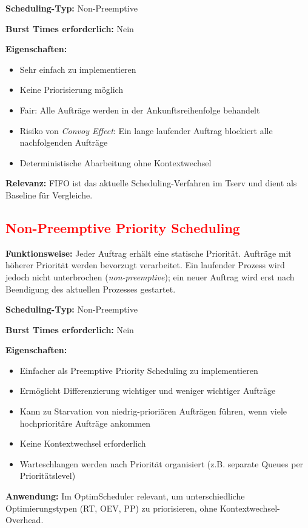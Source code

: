 \textbf{Scheduling-Typ:} Non-Preemptive

\textbf{Burst Times erforderlich:} Nein

\textbf{Eigenschaften:}
\begin{itemize}
    \item Sehr einfach zu implementieren
    \item Keine Priorisierung möglich
    \item Fair: Alle Aufträge werden in der Ankunftsreihenfolge behandelt
    \item Risiko von \textit{Convoy Effect}: Ein lange laufender Auftrag blockiert alle nachfolgenden Aufträge
    \item Deterministische Abarbeitung ohne Kontextwechsel
\end{itemize}

\textbf{Relevanz:} FIFO ist das aktuelle Scheduling-Verfahren im Tserv und dient als Baseline für Vergleiche.

\subsection{\textcolor{red}{Non-Preemptive Priority Scheduling}}

\textbf{Funktionsweise:} Jeder Auftrag erhält eine statische Priorität. Aufträge mit höherer Priorität werden bevorzugt verarbeitet. Ein laufender Prozess wird jedoch nicht unterbrochen (\textit{non-preemptive}); ein neuer Auftrag wird erst nach Beendigung des aktuellen Prozesses gestartet.

\textbf{Scheduling-Typ:} Non-Preemptive

\textbf{Burst Times erforderlich:} Nein

\textbf{Eigenschaften:}
\begin{itemize}
    \item Einfacher als Preemptive Priority Scheduling zu implementieren
    \item Ermöglicht Differenzierung wichtiger und weniger wichtiger Aufträge
    \item Kann zu Starvation von niedrig-prioriären Aufträgen führen, wenn viele hochprioritäre Aufträge ankommen
    \item Keine Kontextwechsel erforderlich
    \item Warteschlangen werden nach Priorität organisiert (z.B. separate Queues per Prioritätslevel)
\end{itemize}

\textbf{Anwendung:} Im OptimScheduler relevant, um unterschiedliche Optimierungstypen (RT, OEV, PP) zu priorisieren, ohne Kontextwechsel-Overhead.

